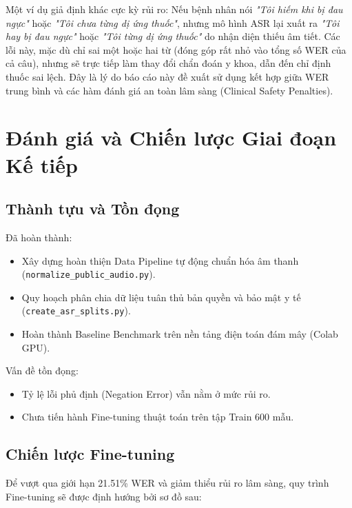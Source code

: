 \documentclass[12pt,a4paper]{article}
\begin{document}
Một ví dụ giả định khác cực kỳ rủi ro: Nếu bệnh nhân nói \textit{"Tôi hiếm khi bị đau ngực"} hoặc \textit{"Tôi chưa từng dị ứng thuốc"}, nhưng mô hình ASR lại xuất ra \textit{"Tôi hay bị đau ngực"} hoặc \textit{"Tôi từng dị ứng thuốc"} do nhận diện thiếu âm tiết. Các lỗi này, mặc dù chỉ sai một hoặc hai từ (đóng góp rất nhỏ vào tổng số WER của cả câu), nhưng sẽ trực tiếp làm thay đổi chẩn đoán y khoa, dẫn đến chỉ định thuốc sai lệch. Đây là lý do báo cáo này đề xuất sử dụng kết hợp giữa WER trung bình và các hàm đánh giá an toàn lâm sàng (Clinical Safety Penalties).

\section{Đánh giá và Chiến lược Giai đoạn Kế tiếp}

\subsection{Thành tựu và Tồn đọng}
Đã hoàn thành:
\begin{itemize}[leftmargin=1.2cm]
    \item Xây dựng hoàn thiện Data Pipeline tự động chuẩn hóa âm thanh (\texttt{normalize\_public\_audio.py}).
    \item Quy hoạch phân chia dữ liệu tuân thủ bản quyền và bảo mật y tế (\texttt{create\_asr\_splits.py}).
    \item Hoàn thành Baseline Benchmark trên nền tảng điện toán đám mây (Colab GPU).
\end{itemize}

Vấn đề tồn đọng:
\begin{itemize}[leftmargin=1.2cm]
    \item Tỷ lệ lỗi phủ định (Negation Error) vẫn nằm ở mức rủi ro.
    \item Chưa tiến hành Fine-tuning thuật toán trên tập Train 600 mẫu.
\end{itemize}

\subsection{Chiến lược Fine-tuning}

Để vượt qua giới hạn 21.51\% WER và giảm thiểu rủi ro lâm sàng, quy trình Fine-tuning sẽ được định hướng bởi sơ đồ sau:
\end{document}
